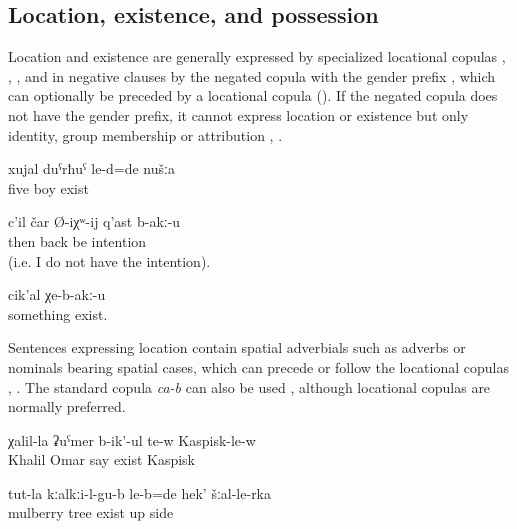 \subsection{Location, existence, and possession}
\label{ssec:Location, existence, and possession}

Location and existence are generally expressed by specialized locational copulas , , , and in negative clauses by the negated copula with the gender prefix , which can optionally be preceded by a locational copula  (). If the negated copula does not have the gender prefix, it cannot express location or existence but only identity, group membership or attribution , . 
%
\begin{exe}
	\ex	\label{ex:We were five guys}
	\gll	xujal	duˁrħuˁ	le-d=de	nušːa\\
		five	boy	exist	\\
	\glt	{}
	

	\ex	\label{ex:There is no intention to go back}
	\gll	c'il	čar	Ø-iχʷ-ij	q'ast	b-akː-u\\
		then	back	be	intention	\\
	\glt	{} (i.e. I do not have the intention).

	\ex	\label{ex:There is nothing more}
	\gll	cik'al	χe-b-akː-u\\
		something	exist.\\
	\glt	{}

\end{exe}

Sentences expressing location contain spatial adverbials such as adverbs or nominals bearing spatial cases, which can precede or follow the locational copulas , . The standard copula \textit{ca-b} can also be used , although locational copulas are normally preferred. 

\begin{exe}
	\ex	\label{ex:Omar's Khalil is in Kaspisk}
	\gll	χalil-la	ʡuˁmer	b-ik'-ul	te-w	Kaspisk-le-w\\
		Khalil	Omar	say	exist	Kaspisk\\
	\glt	{}

	\ex	\label{ex:‎They were under the mulberry tree, from that side}
	\gll	tut-la	kːalkːi-l-gu-b	le-b=de	hek'	šːal-le-rka\\
		mulberry	tree	exist	up	side\\
	\glt	{}

\end{exe}

